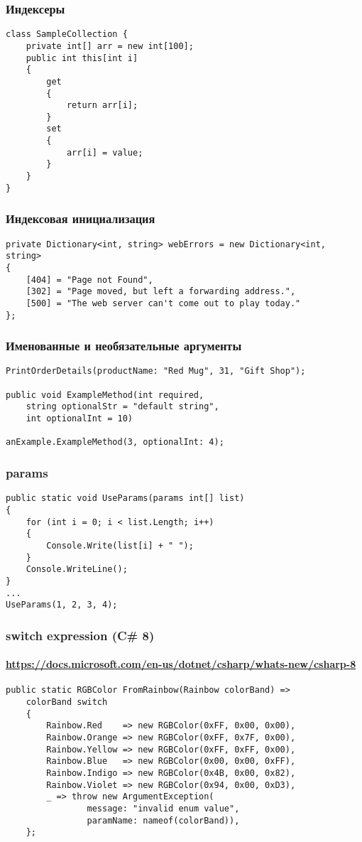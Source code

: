 \documentclass[xetex,mathserif,serif]{beamer}
\begin{document}
	\begin{frame}[fragile]
		\frametitle{Индексеры}
		\begin{verbatim}
class SampleCollection {
    private int[] arr = new int[100];
    public int this[int i]
    {
        get
        {
            return arr[i];
        }
        set
        {
            arr[i] = value;
        }
    }
}
		\end{verbatim}
	\end{frame}

	\begin{frame}[fragile]
		\frametitle{Индексовая инициализация}
		\begin{verbatim}
private Dictionary<int, string> webErrors = new Dictionary<int, string>
{
    [404] = "Page not Found",
    [302] = "Page moved, but left a forwarding address.",
    [500] = "The web server can't come out to play today."
};
		\end{verbatim}
	\end{frame}

	\begin{frame}[fragile]
		\frametitle{Именованные и необязательные аргументы}
		\begin{verbatim}
PrintOrderDetails(productName: "Red Mug", 31, "Gift Shop");

public void ExampleMethod(int required, 
    string optionalStr = "default string",
    int optionalInt = 10)

anExample.ExampleMethod(3, optionalInt: 4);
		\end{verbatim}
	\end{frame}

	\begin{frame}[fragile]
		\frametitle{params}
		\begin{verbatim}
public static void UseParams(params int[] list)
{
    for (int i = 0; i < list.Length; i++)
    {
        Console.Write(list[i] + " ");
    }
    Console.WriteLine();
}
...
UseParams(1, 2, 3, 4);
		\end{verbatim}
	\end{frame}

	\begin{frame}[fragile]
		\frametitle{switch expression (C\# 8)}
		\framesubtitle{\url{https://docs.microsoft.com/en-us/dotnet/csharp/whats-new/csharp-8}}
		\begin{verbatim}
public static RGBColor FromRainbow(Rainbow colorBand) =>
    colorBand switch
    {
        Rainbow.Red    => new RGBColor(0xFF, 0x00, 0x00),
        Rainbow.Orange => new RGBColor(0xFF, 0x7F, 0x00),
        Rainbow.Yellow => new RGBColor(0xFF, 0xFF, 0x00),
        Rainbow.Blue   => new RGBColor(0x00, 0x00, 0xFF),
        Rainbow.Indigo => new RGBColor(0x4B, 0x00, 0x82),
        Rainbow.Violet => new RGBColor(0x94, 0x00, 0xD3),
        _ => throw new ArgumentException(
                message: "invalid enum value", 
                paramName: nameof(colorBand)),
    };
		\end{verbatim}
	\end{frame}
\end{document}
